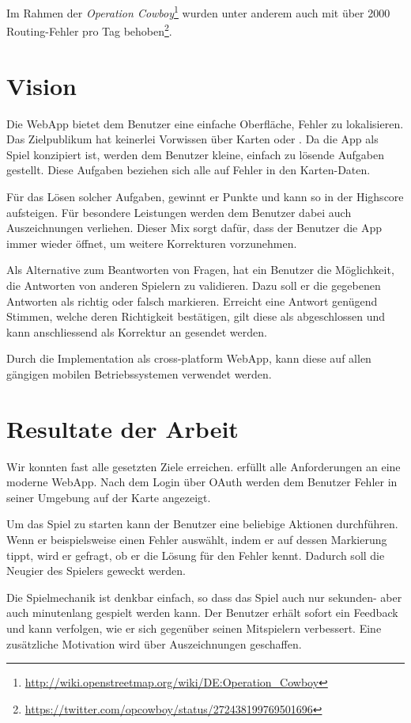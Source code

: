 Im Rahmen der \emph{Operation Cowboy}\footnote{\url{http://wiki.openstreetmap.org/wiki/DE:Operation_Cowboy}} wurden unter anderem auch mit  über 2000 \gls{Routing}-Fehler pro Tag behoben\footnote{\url{https://twitter.com/opcowboy/status/272438199769501696}}.

\section{Vision}
Die \gls{WebApp} \kort{} bietet dem Benutzer eine einfache Oberfläche, Fehler zu lokalisieren.
Das Zielpublikum hat keinerlei Vorwissen über Karten oder .
Da die App als Spiel konzipiert ist, werden dem Benutzer kleine, einfach zu lösende Aufgaben gestellt.
Diese Aufgaben beziehen sich alle auf Fehler in den Karten-Daten.

Für das Lösen solcher Aufgaben, gewinnt er Punkte und kann so in der Highscore aufsteigen.
Für besondere Leistungen werden dem Benutzer dabei auch Auszeichnungen verliehen.
Dieser Mix sorgt dafür, dass der Benutzer die App immer wieder öffnet, um weitere Korrekturen vorzunehmen.

Als Alternative zum Beantworten von Fragen, hat ein Benutzer die Möglichkeit, die Antworten von anderen Spielern zu validieren.
Dazu soll er die gegebenen Antworten als richtig oder falsch markieren.
Erreicht eine Antwort genügend Stimmen, welche deren Richtigkeit bestätigen, gilt diese als abgeschlossen und kann anschliessend als Korrektur an  gesendet werden.

Durch die Implementation als cross-platform \gls{WebApp}, kann diese auf allen gängigen mobilen Betriebssystemen verwendet werden.

\section{Resultate der Arbeit}
Wir konnten fast alle gesetzten Ziele erreichen.
\kort{} erfüllt alle Anforderungen an eine moderne \gls{WebApp}.
Nach dem Login über \gls{OAuth} werden dem Benutzer Fehler in seiner Umgebung auf der Karte angezeigt.

Um das Spiel zu starten kann der Benutzer eine beliebige Aktionen durchführen.
Wenn er beispielsweise einen Fehler auswählt, indem er auf dessen Markierung tippt, wird er gefragt, ob er die Lösung für den Fehler kennt.
Dadurch soll die Neugier des Spielers geweckt werden.

Die Spielmechanik ist denkbar einfach, so dass das Spiel auch nur sekunden- aber auch  minutenlang gespielt werden kann.
Der Benutzer erhält sofort ein Feedback und kann verfolgen, wie er sich gegenüber seinen Mitspielern verbessert.
Eine zusätzliche Motivation wird über Auszeichnungen geschaffen.

